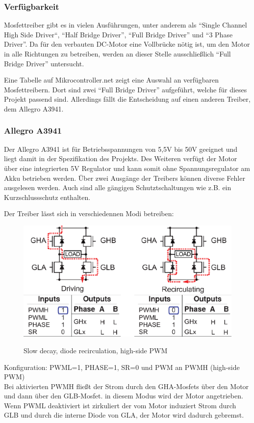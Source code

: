 \subsubsection{Verfügbarkeit}

Mosfettreiber gibt es in vielen Ausführungen, unter anderem als ``Single Channel High Side Driver``, ``Half Bridge Driver'', ``Full Bridge Driver''
und ``3 Phase Driver''. Da für den verbauten DC-Motor eine Vollbrücke nötig ist, um den Motor in alle Richtungen zu betreiben, werden an dieser Stelle
ausschließlich ``Full Bridge Driver'' untersucht.

Eine Tabelle auf Mikrocontroller.net\cite{FET_D_TABLE} zeigt eine Auswahl an verfügbaren Mosfettreibern. Dort sind zwei
``Full Bridge Driver'' aufgeführt, welche für dieses Projekt passend sind. Allerdings fällt die Entscheidung auf einen anderen Treiber,
dem Allegro A3941.
\subsubsection{Allegro A3941}
Der Allegro A3941 ist für Betriebsspannungen von 5,5V bis 50V geeignet und liegt damit in der Spezifikation des Projekts.
Des Weiteren verfügt der Motor über eine integrierten 5V Regulator und kann somit ohne Spannungsregulator am Akku betrieben werden.
Über zwei Ausgänge der Treibers können diverse Fehler ausgelesen werden. Auch sind alle gängigen Schutztschaltungen wie z.B. ein Kurzschlussschutz enthalten.


Der Treiber lässt sich in verschiedennen Modi betreiben:

\begin{figure}[H]
\centering
\includegraphics[width=.8\textwidth]{3941_1.png}\\
\caption{Slow decay, diode recirculation, high-side PWM}%
\label{fig:39411}
\end{figure}

Konfiguration: PWML=1, PHASE=1, SR=0 und PWM an PWMH (high-side PWM)\\
Bei aktivierten PWMH fließt der Strom durch den GHA-Mosfets über den Motor und
dann über den GLB-Mosfet. in diesem Modus wird der Motor angetrieben.
Wenn PWML deaktiviert ist zirkuliert der vom Motor induziert Strom durch GLB und durch
die interne Diode von GLA, der Motor wird dadurch gebremst.


